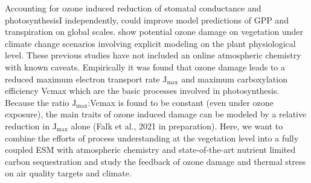 Accounting for ozone induced reduction of stomatal conductance and photosynthesisI independently, \textcite{BGS:Lombardozzi2012} could improve model predictions of GPP and transpiration on global scales. \textcite{BGSD:Franz2020} show potential ozone damage on vegetation under climate change scenarios involving explicit modeling on the plant physiological level. These previous studies have not included an online atmospheric chemistry with known caveats. 
Empirically it was found that ozone damage leads to a reduced maximum electron transport rate $\mathrm{J_{max}}$ and maximum carboxylation efficiency Vcmax \parencite{EJA:Emberson2018} which are the basic processes involved in photosynthesis. Because the ratio $\mathrm{J_{max}}$:Vcmax is found to be constant (even under ozone exposure), the main traits of ozone induced damage can be modeled by a relative reduction in $\mathrm{J_{max}}$ alone (Falk et al., 2021 in preparation)\parencites{BGS:Franz2017}{BGS:Franz2018}.
Here, we want to combine the efforts of process understanding at the vegetation level into a fully coupled ESM with atmospheric chemistry and state-of-the-art nutrient limited carbon sequestration and study the feedback of ozone damage and thermal stress on air quality targets and climate.



